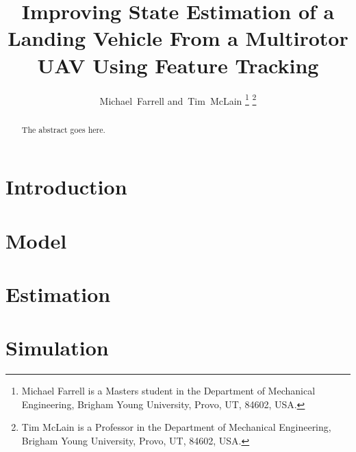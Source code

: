 \documentclass[journal,onecolumn]{IEEEtran}
\begin{document}
\title{Improving State Estimation of a Landing Vehicle From a Multirotor UAV
Using Feature Tracking}

\author{Michael~Farrell
        and~Tim~McLain
\thanks{Michael Farrell is a Masters student in the Department of Mechanical
Engineering, Brigham Young University, Provo, UT, 84602, USA.}%
\thanks{Tim McLain is a Professor in the Department of Mechanical
Engineering, Brigham Young University, Provo, UT, 84602, USA.}%
}

\maketitle

\begin{abstract}
The abstract goes here.
\end{abstract}

\section{Introduction} \label{sec:intro}

% 


\section{Model} \label{sec:model}


% 
% 

\section{Estimation} \label{sec:estimation}




% 


\section{Simulation} \label{sec:simulation}

\end{document}
